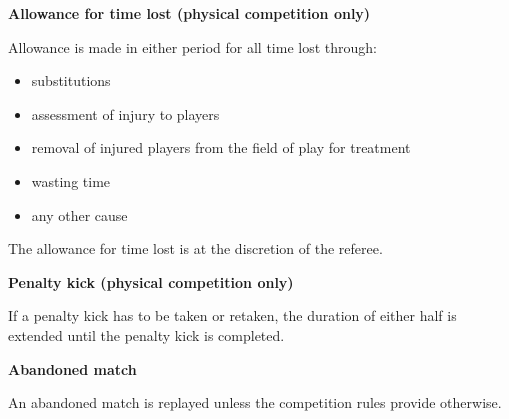 \bigskip

{\bfseries Allowance for time lost (physical competition only)}

\headlinebox

Allowance is made in either period for all time lost through:

\begin{itemize}
\item substitutions
\item assessment of injury to players
\item removal of injured players from the field of play for treatment
\item wasting time
\item any other cause
\end{itemize}

The allowance for time lost is at the discretion of the referee.

\bigskip

{\bfseries Penalty kick (physical competition only)}

\headlinebox

If a penalty kick has to be taken or retaken, the duration of either half is extended until the penalty kick is completed.

\bigskip

{\sffamily
\textbf{Abandoned match} }

\headlinebox

An abandoned match is replayed unless the competition rules provide otherwise.
